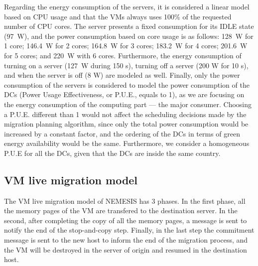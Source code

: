 Regarding the energy consumption of the servers, it is considered a linear model based on CPU usage and that the VMs always uses 100\% of the requested number of CPU cores. The server presents a fixed consumption for its IDLE state (97~W), and the power consumption based on core usage is as follows: 128~W for 1 core; 146.4~W for 2 cores; 164.8~W for 3 cores; 183.2~W for 4 cores; 201.6~W for 5 cores; and 220~W with 6 cores. Furthermore, the energy consumption of turning on a server (127~W during 150 s), turning off a server (200 W for 10 s), and when the server is off (8 W) are modeled as well. Finally, only the power consumption of the servers is considered to model the power consumption of the DCs (Power Usage Effectiveness, or P.U.E., equals to 1), as we are focusing on the energy consumption of the computing part --- the major consumer. Choosing a P.U.E. different than 1 would not affect the scheduling decisions made by the migration planning algorithm, since only the total power consumption would be increased by a constant factor, and the ordering of the DCs in terms of green energy availability would be the same.  Furthermore, we consider a homogeneous P.U.E for all the DCs, given that the DCs are inside the same country.


\subsection{VM live migration model}

The VM live migration model of NEMESIS has 3 phases. In the first phase, all the memory pages of the VM are transfered to the destination server. In the second, after completing the copy of all the memory pages, a message is sent to notify the end of the stop-and-copy step. Finally, in the last step the commitment message is sent to the new host to inform the end of the migration process, and the VM will be destroyed in the server of origin and resumed in the destination host. 

